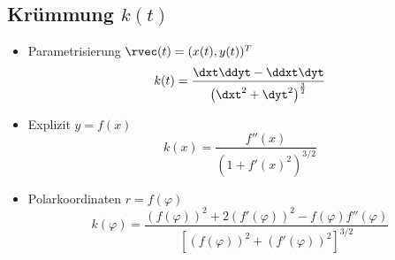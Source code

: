 \subsection{Krümmung \texorpdfstring{\hfill $k(t)$}{k(t)}}
    \begin{itemize}
        \item Parametrisierung $\rvec(t) = (x(t),y(t))^T$
            $$
                k(t) = \frac{\dxt \ddyt - \ddxt \dyt}{\left( \dxt^2 + \dyt^2 \right)^{\frac{3}{2}}}
            $$
        \item Explizit $y=f(x)$
            $$
                k(x) = \frac{f''(x)}{(1+f'(x)^2)^{3/2}}
            $$
        \item Polarkoordinaten $r=f(\varphi)$
            $$
                k(\varphi) = \frac{(f(\varphi))^2 + 2(f'(\varphi))^2-f(\varphi)f''(\varphi)}{\left[(f(\varphi))^2 + (f'(\varphi))^2\right]^{3/2}}
            $$
    \end{itemize}